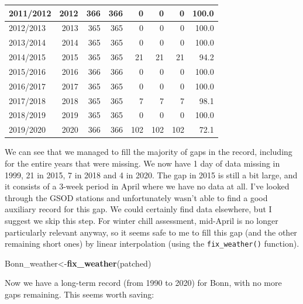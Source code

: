 \documentclass[
]{book}
\newenvironment{Shaded}{\begin{snugshade}}{\end{snugshade}}
\newcommand{\KeywordTok}[1]{\textcolor[rgb]{0.13,0.29,0.53}{\textbf{#1}}}
\newcommand{\NormalTok}[1]{#1}
\newcommand{\OperatorTok}[1]{\textcolor[rgb]{0.81,0.36,0.00}{\textbf{#1}}}
\newcommand{\StringTok}[1]{\textcolor[rgb]{0.31,0.60,0.02}{#1}}
\begin{document}
\begin{table}
\begin{tabular}[t]{l|r|r|r|r|r|r|r}
\hline
2011/2012 & 2012 & 366 & 366 & 0 & 0 & 0 & 100.0\\
\hline
2012/2013 & 2013 & 365 & 365 & 0 & 0 & 0 & 100.0\\
\hline
2013/2014 & 2014 & 365 & 365 & 0 & 0 & 0 & 100.0\\
\hline
2014/2015 & 2015 & 365 & 365 & 21 & 21 & 21 & 94.2\\
\hline
2015/2016 & 2016 & 366 & 366 & 0 & 0 & 0 & 100.0\\
\hline
2016/2017 & 2017 & 365 & 365 & 0 & 0 & 0 & 100.0\\
\hline
2017/2018 & 2018 & 365 & 365 & 7 & 7 & 7 & 98.1\\
\hline
2018/2019 & 2019 & 365 & 365 & 0 & 0 & 0 & 100.0\\
\hline
2019/2020 & 2020 & 366 & 366 & 102 & 102 & 102 & 72.1\\
\hline
\end{tabular}
\end{table}

We can see that we managed to fill the majority of gaps in the record, including for the entire years that were missing. We now have 1 day of data missing in 1999, 21 in 2015, 7 in 2018 and 4 in 2020. The gap in 2015 is still a bit large, and it consists of a 3-week period in April where we have no data at all. I've looked through the GSOD stations and unfortunately wasn't able to find a good auxiliary record for this gap. We could certainly find data elsewhere, but I suggest we skip this step. For winter chill assessment, mid-April is no longer particularly relevant anyway, so it seems safe to me to fill this gap (and the other remaining short ones) by linear interpolation (using the \texttt{fix\_weather()} function).

\begin{Shaded}
\begin{Highlighting}[]
\NormalTok{Bonn_weather<-}\KeywordTok{fix_weather}\NormalTok{(patched)}
\end{Highlighting}
\end{Shaded}

Now we have a long-term record (from 1990 to 2020) for Bonn, with no more gaps remaining. This seems worth saving:

\begin{Shaded}
\end{Shaded}
\end{document}
